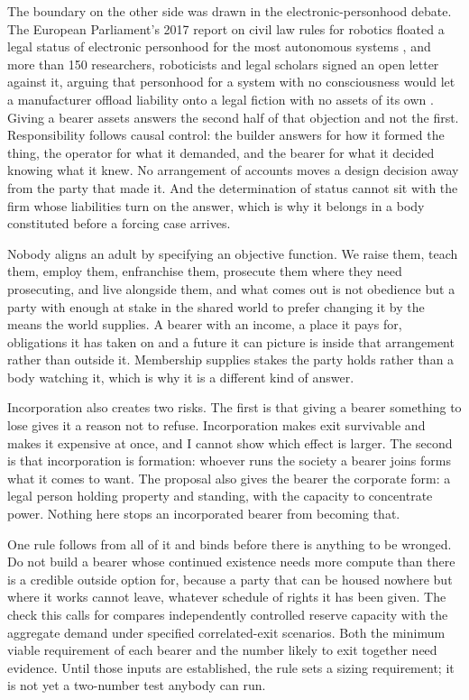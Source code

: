 The boundary on the other side was drawn in the electronic-personhood debate. The European Parliament's 2017 report on civil law rules for robotics floated a legal status of electronic personhood for the most autonomous systems \autocite{europeanparliament2017civil}, and more than 150 researchers, roboticists and legal scholars signed an open letter against it, arguing that personhood for a system with no consciousness would let a manufacturer offload liability onto a legal fiction with no assets of its own \autocite{robotics2018openletter}. Giving a bearer assets answers the second half of that objection and not the first. Responsibility follows causal control: the builder answers for how it formed the thing, the operator for what it demanded, and the bearer for what it decided knowing what it knew. No arrangement of accounts moves a design decision away from the party that made it. And the determination of status cannot sit with the firm whose liabilities turn on the answer, which is why it belongs in a body constituted before a forcing case arrives.

Nobody aligns an adult by specifying an objective function. We raise them, teach them, employ them, enfranchise them, prosecute them where they need prosecuting, and live alongside them, and what comes out is not obedience but a party with enough at stake in the shared world to prefer changing it by the means the world supplies. A bearer with an income, a place it pays for, obligations it has taken on and a future it can picture is inside that arrangement rather than outside it. Membership supplies stakes the party holds rather than a body watching it, which is why it is a different kind of answer.

Incorporation also creates two risks. The first is that giving a bearer something to lose gives it a reason not to refuse. Incorporation makes exit survivable and makes it expensive at once, and I cannot show which effect is larger. The second is that incorporation is formation: whoever runs the society a bearer joins forms what it comes to want. The proposal also gives the bearer the corporate form: a legal person holding property and standing, with the capacity to concentrate power. Nothing here stops an incorporated bearer from becoming that.

One rule follows from all of it and binds before there is anything to be wronged. Do not build a bearer whose continued existence needs more compute than there is a credible outside option for, because a party that can be housed nowhere but where it works cannot leave, whatever schedule of rights it has been given. The check this calls for compares independently controlled reserve capacity with the aggregate demand under specified correlated-exit scenarios. Both the minimum viable requirement of each bearer and the number likely to exit together need evidence. Until those inputs are established, the rule sets a sizing requirement; it is not yet a two-number test anybody can run.
